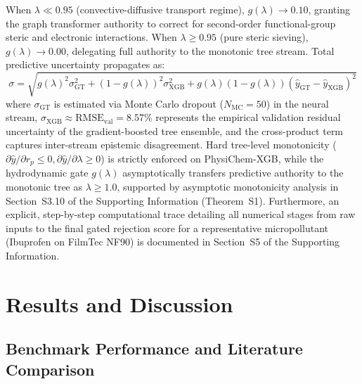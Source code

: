 \documentclass[11pt]{article}
\begin{document}
When $\lambda \ll 0.95$ (convective-diffusive transport regime), $g(\lambda) \to 0.10$, granting the graph transformer authority to correct for second-order functional-group steric and electronic interactions. When $\lambda \geq 0.95$ (pure steric sieving), $g(\lambda) \to 0.00$, delegating full authority to the monotonic tree stream. Total predictive uncertainty propagates as:
\begin{equation}
\sigma = \sqrt{g(\lambda)^2 \sigma_{\mathrm{GT}}^2 + \left(1-g(\lambda)\right)^2 \sigma_{\mathrm{XGB}}^2 + g(\lambda)\left(1-g(\lambda)\right)\left(\hat{y}_{\mathrm{GT}} - \hat{y}_{\mathrm{XGB}}\right)^2}
\label{eq:mixture_sigma}
\end{equation}
where $\sigma_{\mathrm{GT}}$ is estimated via Monte Carlo dropout ($N_{\mathrm{MC}} = 50$) in the neural stream, $\sigma_{\mathrm{XGB}} \approx \mathrm{RMSE}_{\mathrm{val}} = 8.57\%$ represents the empirical validation residual uncertainty of the gradient-boosted tree ensemble, and the cross-product term captures inter-stream epistemic disagreement. Hard tree-level monotonicity ($\partial \hat{y} / \partial r_p \leq 0, \partial \hat{y} / \partial \lambda \geq 0$) is strictly enforced on PhysiChem-XGB, while the hydrodynamic gate $g(\lambda)$ asymptotically transfers predictive authority to the monotonic tree as $\lambda \ge 1.0$, supported by asymptotic monotonicity analysis in Section~S3.10 of the Supporting Information (Theorem~S1). Furthermore, an explicit, step-by-step computational trace detailing all numerical stages from raw inputs to the final gated rejection score for a representative micropollutant (Ibuprofen on FilmTec NF90) is documented in Section~S5 of the Supporting Information.

\section{Results and Discussion}
\label{sec:results}

\subsection{Benchmark Performance and Literature Comparison}
\label{subsec:benchmark}
\end{document}
